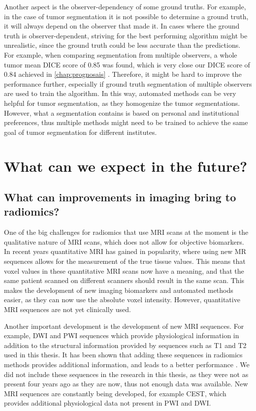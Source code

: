 Another aspect is the observer-dependency of some ground truths.
For example, in the case of tumor segmentation it is not possible to determine a  ground truth, it will always depend on the observer that made it.
In cases where the ground truth is observer-dependent, striving for the best performing algorithm might be unrealistic, since the ground truth could be less accurate than the predictions.
For example, when comparing segmentation from multiple observers, a whole \gls{tumor} mean DICE score of 0.85 was found, which is very close our DICE score of 0.84 achieved in \cref{chap:prognosais} \autocite{menze2015brats}.
Therefore, it might be hard to improve the performance further, especially if ground truth segmentation of multiple observers are used to train the algorithm.
In this way, automated methods can be very helpful for \gls{tumor} segmentation, as they homogenize the \gls{tumor} segmentations.
However, what a segmentation contains is based on personal and institutional preferences, thus multiple methods might need to be trained to achieve the same goal of \gls{tumor} segmentation for different institutes.


\section{What can we expect in the future?}\label{sec:discussion_future}


\subsection{What can improvements in imaging bring to radiomics?}

One of the big challenges for radiomics that use \gls{MRI} scans at the moment is the qualitative nature of \gls{MRI} scans, which does not allow for objective biomarkers.
In recent years quantitative \gls{MRI} has gained in popularity, where using new \gls{MR} sequences allows for the measurement of the true tissue values.
This means that voxel values in these quantitative \gls{MRI} scans now have a meaning, and that the same patient scanned on different scanners should result in the same scan.
This makes the development of new imaging biomarkers and automated methods easier, as they can now use the absolute voxel intensity.
However, quantitative \gls{MRI} sequences are not yet clinically used.

Another important development is the development of new \gls{MRI} sequences.
For example, \gls{DWI} and \gls{PWI} sequences which provide physiological information in addition to the structural information provided by sequences such as \gls{T1} and \gls{T2} used in this thesis.
It has been shown that adding these sequences in radiomics methods provides additional information, and leads to a better performance \autocite{park2020radiomicsdwi,kim2020radiomicsdwi}.
We did not include these sequences in the research in this thesis, as they were not as present four years ago as they are now, thus not enough data was available.
New \gls{MRI} sequences are constantly being developed, for example \gls{CEST}, which provides additional physiological data not present in \gls{PWI} and \gls{DWI}.

